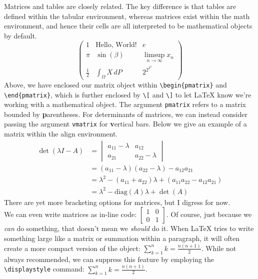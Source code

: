 \documentclass[12pt]{article}	%
\begin{document}
Matrices and tables are closely related. The key difference is that tables are defined within the tabular environment, whereas matrices exist within the math environment, and hence their cells are all interpreted to be mathematical objects by default. 
	\[
		\begin{pmatrix}
			1		& \text{Hello, World!}				& e								\\
			\pi		& \sin(\beta)					& \displaystyle \limsup_{n \to \infty} x_n	\\
			\frac{1}{2} & \displaystyle \int_\Omega X \, dP	& 2^{2^{2^{2}}}
		\end{pmatrix}
	\]
Above, we have enclosed our matrix object within \verb!\begin{pmatrix}! and \verb!\end{pmatrix}!, which is further enclosed by \verb!\[! and \verb!\]! to let \LaTeX{} know we're working with a mathematical object. The argument \verb!pmatrix! refers to a matrix bounded by {\bf p}arentheses. For determinants of matrices, we can instead consider passing the argument \verb!vmatrix! for {\bf v}ertical bars. Below we give an example of a matrix within the align environment.
	\begin{align*}
		\det(\lambda I - A)
		&= \begin{vmatrix}
			a_{11} - \lambda	& a_{12} \\
			a_{21}			& a_{22} - \lambda
		\end{vmatrix} \\
		&= (a_{11} - \lambda)(a_{22} - \lambda) - a_{12} a_{21} \\
		&= \lambda^2 - (a_{11} + a_{22}) \lambda + (a_{11} a_{22} - a_{12} a_{21}) \\
		&= \lambda^2 - \text{diag}(A) \lambda + \det(A)
	\end{align*}
There are yet more bracketing options for matrices, but I digress for now. \\

We can even write matrices as in-line code: $\begin{bmatrix} 1 & 0 \\ 0 & 1 \end{bmatrix}$. Of course, just because we {\it can} do something, that doesn't mean we {\it should} do it. When \LaTeX{} tries to write something large like a matrix or summation within a paragraph, it will often create a more compact version of the object: $\sum_{k = 1}^n k = \frac{n(n + 1)}{2}$. While not always recommended, we can suppress this feature by employing the \verb!\displaystyle! command: $\displaystyle \sum_{k = 1}^n k = \frac{n(n + 1)}{2}$.
\end{document}
